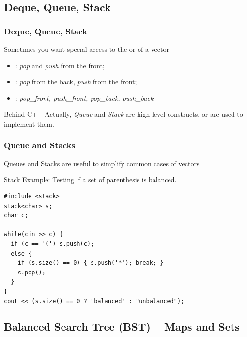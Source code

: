 \documentclass{beamer}
\begin{document}
\subsection{Deque, Queue, Stack}

\begin{frame}
  \frametitle{Deque, Queue, Stack}

  Sometimes you want special access to the  or 
  of a vector.

  \bigskip

  \begin{itemize}
    \item {}: \emph{pop} and \emph{push} from the front;
    \bigskip

    \item {}: \emph{pop} from the back, \emph{push} from the front;
    \bigskip

    \item {}: \emph{pop\_front, push\_front, pop\_back, push\_back};
  \end{itemize}
  \bigskip

  \begin{block}{Behind C++}
    Actually, \emph{Queue} and \emph{Stack} are high level constructs,
     or  are used to implement them.
  \end{block}
\end{frame}

\begin{frame}[fragile]
  \frametitle{Queue and Stacks}

  \begin{block}{}
    Queues and Stacks are useful to simplify common cases of vectors
  \end{block}

  Stack Example: Testing if a set of parenthesis is balanced.
{\small
\begin{verbatim}
#include <stack>
stack<char> s;
char c;

while(cin >> c) {
  if (c == '(') s.push(c);
  else {
    if (s.size() == 0) { s.push('*'); break; }
    s.pop();
  }
}
cout << (s.size() == 0 ? "balanced" : "unbalanced");

\end{verbatim}}
\end{frame}


\subsection{Balanced Search Tree (BST) -- Maps and Sets}
\end{document}
